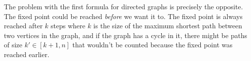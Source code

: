 \documentclass[a4paper]{article}
\begin{document}
\begin{itemize}
	The problem with the first formula for directed graphs is precisely the opposite. The fixed point could be reached {\em before} we want it to. The fixed point is always reached after $k$ steps where $k$ is the size of the maximum shortest path between two vertices in the graph, and if the graph has a cycle in it, there might be paths of size $k' \in [k+1,n]$ that wouldn't be counted because the fixed point was reached earlier.
	
	
\end{itemize}
\end{document}
